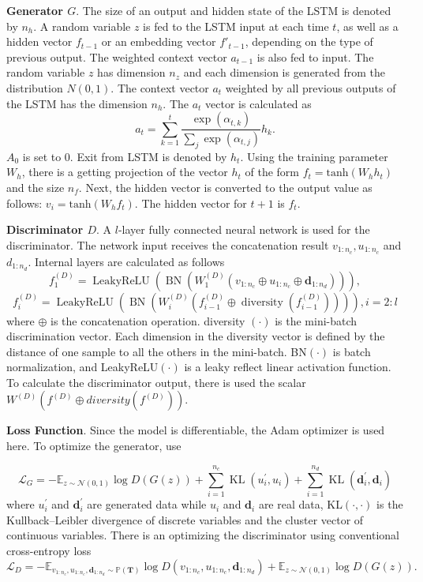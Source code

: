 \documentclass{article}
\begin{document}
\textbf{Generator $G$}. The size of an output and hidden state of the LSTM is denoted by $n_h$. A random variable $z$ is fed to the LSTM input at each time $t$, as well as a hidden vector $f_{t-1}$ or an embedding vector $f'_{t-1}$, depending on the type of previous output. The weighted context vector $a_{t-1}$ is also fed to input. The random variable $z$ has dimension $n_z$ and each dimension is generated from the distribution $N(0, 1)$. The context vector $a_t$ weighted by all previous outputs of the LSTM has the dimension $n_h$. The $a_t$ vector is calculated as
$$a_{t}=\sum_{k=1}^{t} \frac{\exp (\alpha_{t, k})}{\sum_{j} \exp (\alpha_{t, j})} h_{k}.$$
$A_0$ is set to 0. Exit from LSTM is denoted by $h_t$. Using the training parameter $W_h$, there is a getting projection of the vector $h_t$ of the form $f_t = \text{tanh}(W_hh_t)$ and the size $n_f$. Next, the hidden vector is converted to the output value as follows: $v_i = \text{tanh}(W_hf_t)$. The hidden vector for $t+1$ is $f_t$.

\textbf{Discriminator $D$}. A $l$-layer fully connected neural network is used for the discriminator. The network input receives the concatenation result $v_{1:n_c}, u_{1:n_c}$ and $d_{1:n_d}$. Internal layers are calculated as follows
$$f_{1}^{(D)}=\operatorname{LeakyReLU}\left(\operatorname{BN}\left(W_{1}^{(D)}\left(v_{1: n_{c}} \oplus u_{1: n_{c}} \oplus \mathbf{d}_{1: n_{d}}\right)\right)\right),$$
$$f_{i}^{(D)}=\operatorname{LeakyReLU}\left(\operatorname{BN}\left(W_{i}^{(D)}\left(f_{i-1}^{(D)} \oplus \operatorname{diversity}\left(f_{i-1}^{(D)}\right)\right)\right)\right), i=2: l$$
where $\oplus$ is the concatenation operation. diversity $(\cdot)$ is the mini-batch discrimination vector. Each dimension in the diversity vector is defined by the distance of one sample to all the others in the mini-batch. BN$(\cdot)$ is batch normalization, and LeakyReLU$(\cdot)$ is a leaky reflect linear activation function. To calculate the discriminator output, there is used the scalar $W^{(D)}(f^{(D)} \oplus diversity(f^{(D)}))$.

\textbf{Loss Function}. Since the model is differentiable, the Adam optimizer is used here. To optimize the generator, use

$$
\mathcal{L}_{G}=-\mathbb{E}_{z \sim \mathcal{N}(0,1)} \log D(G(z))+\sum_{i=1}^{n_{c}} \operatorname{KL}\left(u_{i}^{\prime}, u_{i}\right)+\sum_{i=1}^{n_{d}} \operatorname{KL}\left(\mathbf{d}_{i}^{\prime}, \mathbf{d}_{i}\right)
$$
where $u_{i}^{\prime}$ and $\mathbf{d}_{i}^{\prime}$ are generated data while $u_{i}$ and $\mathbf{d}_{i}$ are real data, KL$(\cdot, \cdot)$ is the Kullback–Leibler divergence of discrete variables and the cluster vector of continuous variables. There is an optimizing the discriminator using conventional cross-entropy loss
$$
\mathcal{L}_{D}=-\mathbb{E}_{v_{1: n_{c}}, u_{1: n_{c}}, \mathbf{d}_{1: n_{d}} \sim \mathbb{P}(\mathbf{T})} \log D\left(v_{1: n_{c}}, u_{1: n_{c}}, \mathbf{d}_{1: n_{d}}\right)+\mathbb{E}_{z \sim \mathcal{N}(0,1)} \log D(G(z)).
$$
\end{document}
